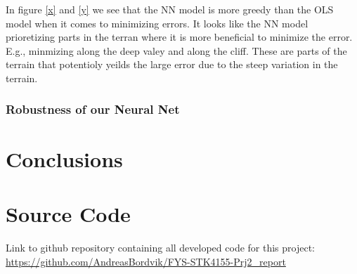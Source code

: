 \documentclass
[twocolumn,
secnumarabic,
nobibnotes,
aps,
prl,
reprint,
groupedaddress,
amsmath,
amssymb
]{revtex4-2}
\begin{document}
In figure \ref{x} and \ref{y} we see that the NN model is more greedy than the OLS model when it comes to minimizing errors. It looks like the NN model prioretizing parts in the terran
where it is more beneficial to minimize the error. E.g., minmizing along the deep valey and along the cliff. These are parts of the terrain that potentioly yeilds the large error due to the steep
variation in the terrain.


\subsubsection{Robustness of our Neural Net}



\section{Conclusions}

\appendix

\section{Source Code}
\label{sec:sc}
Link to github repository containing all developed code for this project: \url{https://github.com/AndreasBordvik/FYS-STK4155-Prj2_report}





\end{document}
